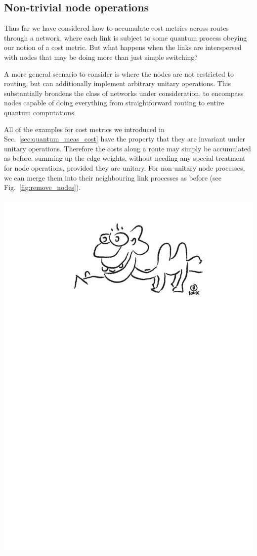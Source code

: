 \documentclass[aps, rmp, twocolumn, amsmath, amssymb, nofootinbib, superscriptaddress, longbibliography, floatfix, table-of-contents, eqsecnum]{revtex4-1}
\begin{document}
%
%

\subsection{Non-trivial node operations}

Thus far we have considered how to accumulate cost metrics across routes through a network, where each link is subject to some quantum process obeying our notion of a cost metric. But what happens when the links are interspersed with nodes that may be doing more than just simple switching?

A more general scenario to consider is where the nodes are not restricted to routing, but can additionally implement arbitrary unitary operations. This substantially broadens the class of networks under consideration, to encompass nodes capable of doing everything from straightforward routing to entire quantum computations.

All of the examples for cost metrics we introduced in Sec.~\ref{sec:quantum_meas_cost} have the property that they are invariant under unitary operations. Therefore the costs along a route may simply be accumulated as before, summing up the edge weights, without needing any special treatment for node operations, provided they are unitary. For non-unitary node processes, we can merge them into their neighbouring link processes as before (see Fig.~\ref{fig:remove_nodes}).

\begin{center}
	\includegraphics[width=0.6\columnwidth]{sketch_10}
\end{center}
\end{document}
